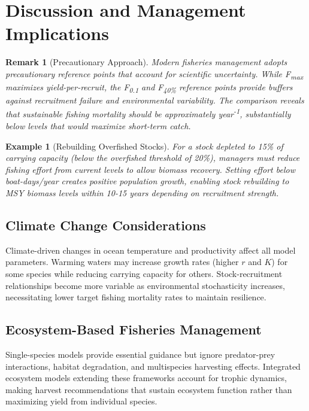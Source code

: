 \documentclass[a4paper, 11pt]{article}
\newtheorem{example}{Example}[section]
\newtheorem{remark}{Remark}[section]
\begin{document}
\section{Discussion and Management Implications}

\begin{remark}[Precautionary Approach]
Modern fisheries management adopts precautionary reference points that account for
scientific uncertainty. While F\textsubscript{max} maximizes yield-per-recruit, the
F\textsubscript{0.1} and F\textsubscript{40\%} reference points provide buffers against
recruitment failure and environmental variability. The comparison reveals that sustainable
fishing mortality should be approximately  year\textsuperscript{-1},
substantially below levels that would maximize short-term catch.
\end{remark}

\begin{example}[Rebuilding Overfished Stocks]
For a stock depleted to 15\% of carrying capacity (below the overfished threshold of 20\%),
managers must reduce fishing effort from current levels to allow biomass recovery. Setting
effort below  boat-days/year creates positive population growth,
enabling stock rebuilding to MSY biomass levels within 10-15 years depending on
recruitment strength.
\end{example}

\subsection{Climate Change Considerations}

Climate-driven changes in ocean temperature and productivity affect all model parameters.
Warming waters may increase growth rates (higher $r$ and $K$) for some species while
reducing carrying capacity for others. Stock-recruitment relationships become more
variable as environmental stochasticity increases, necessitating lower target fishing
mortality rates to maintain resilience.

\subsection{Ecosystem-Based Fisheries Management}

Single-species models provide essential guidance but ignore predator-prey interactions,
habitat degradation, and multispecies harvesting effects. Integrated ecosystem models
extending these frameworks account for trophic dynamics, making harvest recommendations
that sustain ecosystem function rather than maximizing yield from individual species.
\end{document}

